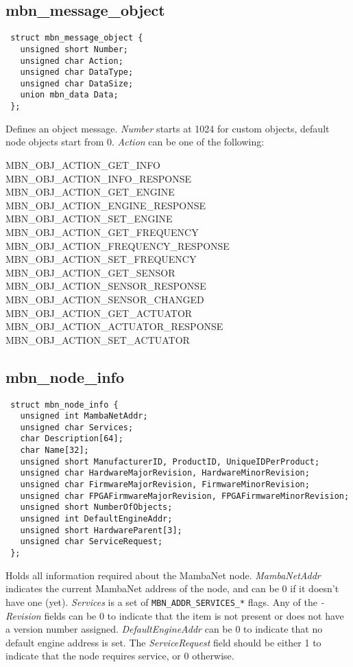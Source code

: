 \subsection{mbn\_message\_object}
\begin{verbatim}
 struct mbn_message_object {
   unsigned short Number;
   unsigned char Action;
   unsigned char DataType;
   unsigned char DataSize;
   union mbn_data Data;
 };
\end{verbatim}
Defines an object message. \textit{Number} starts at 1024 for custom objects, default node objects start from 0. \textit{Action} can be one of the following:
\begin{description}
 \item[MBN\_OBJ\_ACTION\_GET\_INFO]
 \item[MBN\_OBJ\_ACTION\_INFO\_RESPONSE]
 \item[MBN\_OBJ\_ACTION\_GET\_ENGINE]
 \item[MBN\_OBJ\_ACTION\_ENGINE\_RESPONSE]
 \item[MBN\_OBJ\_ACTION\_SET\_ENGINE]
 \item[MBN\_OBJ\_ACTION\_GET\_FREQUENCY]
 \item[MBN\_OBJ\_ACTION\_FREQUENCY\_RESPONSE]
 \item[MBN\_OBJ\_ACTION\_SET\_FREQUENCY]
 \item[MBN\_OBJ\_ACTION\_GET\_SENSOR]
 \item[MBN\_OBJ\_ACTION\_SENSOR\_RESPONSE]
 \item[MBN\_OBJ\_ACTION\_SENSOR\_CHANGED]
 \item[MBN\_OBJ\_ACTION\_GET\_ACTUATOR]
 \item[MBN\_OBJ\_ACTION\_ACTUATOR\_RESPONSE]
 \item[MBN\_OBJ\_ACTION\_SET\_ACTUATOR]
\end{description}


\subsection{mbn\_node\_info}
\begin{verbatim}
 struct mbn_node_info {
   unsigned int MambaNetAddr;
   unsigned char Services;
   char Description[64];
   char Name[32];
   unsigned short ManufacturerID, ProductID, UniqueIDPerProduct;
   unsigned char HardwareMajorRevision, HardwareMinorRevision;
   unsigned char FirmwareMajorRevision, FirmwareMinorRevision;
   unsigned char FPGAFirmwareMajorRevision, FPGAFirmwareMinorRevision;
   unsigned short NumberOfObjects;
   unsigned int DefaultEngineAddr;
   unsigned short HardwareParent[3];
   unsigned char ServiceRequest;
 };
\end{verbatim}
Holds all information required about the MambaNet node. \textit{MambaNetAddr} indicates the current MambaNet address of the node, and can be 0 if it doesn't have one (yet). \textit{Services} is a set of \verb|MBN_ADDR_SERVICES_*| flags. Any of the \textit{-Revision} fields can be 0 to indicate that the item is not present or does not have a version number assigned. \textit{DefaultEngineAddr} can be 0 to indicate that no default engine address is set. The \textit{ServiceRequest} field should be either 1 to indicate that the node requires service, or 0 otherwise.

